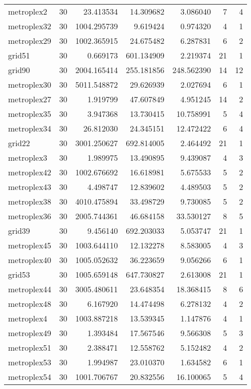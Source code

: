 \begin{longtable}{|l|r|r|r|r|r|r|}
metroplex2 & 30 & 23.413534 & 14.309682 & 3.086040 & 7 & 4 \\
metroplex32 & 30 & 1004.295739 & 9.619424 & 0.974320 & 4 & 1 \\
metroplex29 & 30 & 1002.365915 & 24.675482 & 6.287831 & 6 & 2 \\
grid51 & 30 & 0.669173 & 601.134909 & 2.219374 & 21 & 1 \\
grid90 & 30 & 2004.165414 & 255.181856 & 248.562390 & 14 & 12 \\
metroplex30 & 30 & 5011.548872 & 29.626939 & 2.027694 & 6 & 1 \\
metroplex27 & 30 & 1.919799 & 47.607849 & 4.951245 & 14 & 2 \\
metroplex35 & 30 & 3.947368 & 13.730415 & 10.758991 & 5 & 4 \\
metroplex34 & 30 & 26.812030 & 24.345151 & 12.472422 & 6 & 4 \\
grid22 & 30 & 3001.250627 & 692.814005 & 2.464492 & 21 & 1 \\
metroplex3 & 30 & 1.989975 & 13.490895 & 9.439087 & 4 & 3 \\
metroplex42 & 30 & 1002.676692 & 16.618981 & 5.675533 & 5 & 2 \\
metroplex43 & 30 & 4.498747 & 12.839602 & 4.489503 & 5 & 2 \\
metroplex38 & 30 & 4010.475894 & 33.498729 & 9.730085 & 5 & 2 \\
metroplex36 & 30 & 2005.744361 & 46.684158 & 33.530127 & 8 & 5 \\
grid39 & 30 & 9.456140 & 692.203033 & 5.053747 & 21 & 1 \\
metroplex45 & 30 & 1003.644110 & 12.132278 & 8.583005 & 4 & 3 \\
metroplex40 & 30 & 1005.052632 & 36.223659 & 9.056266 & 6 & 1 \\
grid53 & 30 & 1005.659148 & 647.730827 & 2.613008 & 21 & 1 \\
metroplex44 & 30 & 3005.480611 & 23.648354 & 18.368415 & 8 & 6 \\
metroplex48 & 30 & 6.167920 & 14.474498 & 6.278132 & 4 & 2 \\
metroplex4 & 30 & 1003.887218 & 13.539345 & 1.147876 & 4 & 1 \\
metroplex49 & 30 & 1.393484 & 17.567546 & 9.566308 & 5 & 3 \\
metroplex51 & 30 & 2.388471 & 12.558762 & 5.152482 & 4 & 2 \\
metroplex53 & 30 & 1.994987 & 23.010370 & 1.634582 & 6 & 1 \\
metroplex54 & 30 & 1001.706767 & 20.832556 & 16.100065 & 5 & 4 \\

\end{longtable}
